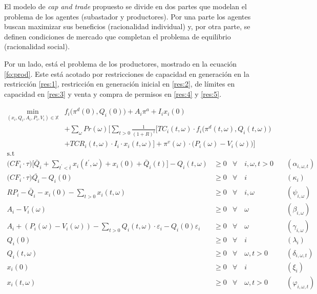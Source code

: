 El modelo de \textit{cap and trade} propuesto se divide en dos partes que modelan el problema de los agentes (subastador y productores). Por una parte los agentes buscan maximizar sus beneficios (racionalidad individual) y, por otra parte, se definen condiciones de mercado que completan el problema de equilibrio (racionalidad social).
\vspace{2.5mm}

Por un lado, está el problema de los productores, mostrado en la ecuación \ref{fo:prod}. Este está acotado por restricciones de capacidad en generación en la restricción \ref{res:1}, restricción en generación inicial en \ref{res:2}, de límites en capacidad en \ref{res:3} y venta y compra de permisos en \ref{res:4} y \ref{res:5}. 

\begin{align}
\min_{(x_i,Q_i,A_i,P_i,V_i)\in \mathbb{X}} &  f_i \big( \pi^d(0),Q_i(0)\big)+ A_i \pi^{a} + I_i x_i(0) \nonumber \\ 
& + \sum_{\omega} Pr(\omega)   \Bigg[ \sum_{t>0} \frac{1}{(1+R)^t} \Big[ TC_i(t,\omega)\cdot f_i \big( \pi^d(t,\omega),Q_i(t,\omega) \big)  \nonumber \\
 & + TCR_i(t,\omega) \cdot I_i\cdot x_i(t,\omega) \Big] + \pi^v(\omega)\cdot \big(P_i(\omega)-V_i(\omega)\big) \Bigg]  \label{fo:prod}\\
     \textrm{s.t \ } \nonumber
\end{align}
\begin{align}
    \Big(CF_i \cdot\tau\Big)  \Bigg[\bar{Q}_i + \sum_{t^{\prime}<\bar{t}} x_i(t^\prime,\omega) + x_i(0)+ \bar{Q}_i(t) \Bigg] - Q_i(t,\omega) & \geq 0  & \forall  \quad i,\omega, t  > 0 & \quad (\alpha_{i,\omega,t})\label{res:1}\\
    \Big(CF_i\cdot\tau \Big)\bar{Q_i}-Q_{i}(0) & \geq 0  & \forall  \quad i & \quad (\kappa_i) \label{res:2}\\
     RP_i - \bar{Q}_i  - x_i(0) - \sum_{t > 0} x_i(t,\omega) & \geq 0 &  \forall \quad i,\omega &   \quad (\psi_{i,\omega}) \label{res:3}\\
 A_{i} -V_i(\omega) & \geq  0  & \forall  \quad \omega & \quad (\beta_{i,\omega}) \label{res:4}\\
 A_{i} + (P_i(\omega) - V_i(\omega))-\sum_{t>0}Q_i(t, \omega)\cdot \varepsilon_{i}-Q_i(0)\varepsilon_{i} & \geq  0  &\forall \quad \omega & \quad (\gamma_{i,\omega})\label{res:5}\\
 Q_i(0) & \geq  0 & \forall \quad i & \quad (\lambda_i) \label{res:q0}\\ 
 Q_i(t, \omega) & \geq  0   & \forall \quad \omega, t >0 & \quad (\delta_{i,\omega,t})\label{res:qt}\\
  x_i(0) & \geq  0 & \forall  \quad i & \quad (\xi_i)  \label{res:capi0}\\ 
  x_i(t, \omega) & \geq  0   & \forall  \quad \omega, t >0 & \quad (\varphi_{i,\omega,t})\label{res:capt}
  \end{align}

